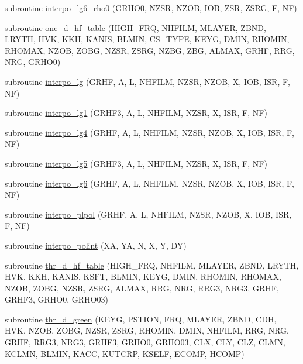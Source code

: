 \begin{DoxyCompactItemize}
\item 
subroutine \hyperlink{Marco_8f90_a26481105d1de3f776fc36a094d319fbb}{interpo\+\_\+lg6\+\_\+rho0} (G\+R\+H\+O0, N\+Z\+SR, N\+Z\+OB, I\+OB, Z\+SR, Z\+S\+RG, F, NF)
\item 
subroutine \hyperlink{Marco_8f90_a70d6bf0b4adeb475f694e6aaa1c9582f}{one\+\_\+d\+\_\+hf\+\_\+table} (H\+I\+G\+H\+\_\+\+F\+RQ, N\+H\+F\+I\+LM, M\+L\+A\+Y\+ER, Z\+B\+ND, L\+R\+Y\+TH, H\+VK, K\+KH, K\+A\+N\+IS, B\+L\+M\+IN, C\+S\+\_\+\+T\+Y\+PE, K\+E\+YG, D\+M\+IN, R\+H\+O\+M\+IN, R\+H\+O\+M\+AX, N\+Z\+OB, Z\+O\+BG, N\+Z\+SR, Z\+S\+RG, N\+Z\+BG, Z\+BG, A\+L\+M\+AX, G\+R\+HF, R\+RG, N\+RG, G\+R\+H\+O0)
\item 
subroutine \hyperlink{Marco_8f90_ab4eafb4c3c596148d85f446d1eb69d54}{interpo\+\_\+lg} (G\+R\+HF, A, L, N\+H\+F\+I\+LM, N\+Z\+SR, N\+Z\+OB, X, I\+OB, I\+SR, F, NF)
\item 
subroutine \hyperlink{Marco_8f90_a3fe5c8bfe5e5729f1b02af3926c68dbc}{interpo\+\_\+lg1} (G\+R\+H\+F3, A, L, N\+H\+F\+I\+LM, N\+Z\+SR, X, I\+SR, F, NF)
\item 
subroutine \hyperlink{Marco_8f90_a351cb438e704ef189fa972f9590cbd80}{interpo\+\_\+lg4} (G\+R\+HF, A, L, N\+H\+F\+I\+LM, N\+Z\+SR, N\+Z\+OB, X, I\+OB, I\+SR, F, NF)
\item 
subroutine \hyperlink{Marco_8f90_a1715ef788d21f1b4a8008fdf5f53bfc2}{interpo\+\_\+lg5} (G\+R\+H\+F3, A, L, N\+H\+F\+I\+LM, N\+Z\+SR, X, I\+SR, F, NF)
\item 
subroutine \hyperlink{Marco_8f90_a5fa32081a6f961179118c3eed68de85f}{interpo\+\_\+lg6} (G\+R\+HF, A, L, N\+H\+F\+I\+LM, N\+Z\+SR, N\+Z\+OB, X, I\+OB, I\+SR, F, NF)
\item 
subroutine \hyperlink{Marco_8f90_afd0f4c3b7f02fba61d9bd11b3a142ac2}{interpo\+\_\+plpol} (G\+R\+HF, A, L, N\+H\+F\+I\+LM, N\+Z\+SR, N\+Z\+OB, X, I\+OB, I\+SR, F, NF)
\item 
subroutine \hyperlink{Marco_8f90_aadd0426cc10854791039735bfa14140d}{interpo\+\_\+polint} (XA, YA, N, X, Y, DY)
\item 
subroutine \hyperlink{Marco_8f90_a0db0bc5f77e1fa8016abcd5554c1ae61}{thr\+\_\+d\+\_\+hf\+\_\+table} (H\+I\+G\+H\+\_\+\+F\+RQ, N\+H\+F\+I\+LM, M\+L\+A\+Y\+ER, Z\+B\+ND, L\+R\+Y\+TH, H\+VK, K\+KH, K\+A\+N\+IS, K\+S\+FT, B\+L\+M\+IN, K\+E\+YG, D\+M\+IN, R\+H\+O\+M\+IN, R\+H\+O\+M\+AX, N\+Z\+OB, Z\+O\+BG, N\+Z\+SR, Z\+S\+RG, A\+L\+M\+AX, R\+RG, N\+RG, R\+R\+G3, N\+R\+G3, G\+R\+HF, G\+R\+H\+F3, G\+R\+H\+O0, G\+R\+H\+O03)
\item 
subroutine \hyperlink{Marco_8f90_a0296c656f8f4846170724584ffa24f15}{thr\+\_\+d\+\_\+green} (K\+E\+YG, P\+S\+T\+I\+ON, F\+RQ, M\+L\+A\+Y\+ER, Z\+B\+ND, C\+DH, H\+VK, N\+Z\+OB, Z\+O\+BG, N\+Z\+SR, Z\+S\+RG, R\+H\+O\+M\+IN, D\+M\+IN, N\+H\+F\+I\+LM, R\+RG, N\+RG, G\+R\+HF, R\+R\+G3, N\+R\+G3, G\+R\+H\+F3, G\+R\+H\+O0, G\+R\+H\+O03, C\+LX, C\+LY, C\+LZ, C\+L\+MN, K\+C\+L\+MN, B\+L\+M\+IN, K\+A\+CC, K\+U\+T\+C\+RP, K\+S\+E\+LF, E\+C\+O\+MP, H\+C\+O\+MP)

\end{DoxyCompactItemize}
